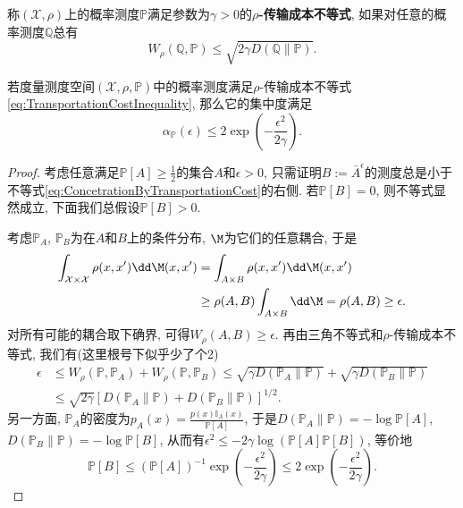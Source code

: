  称$(\mathcal{X}, \rho)$上的概率测度$\mathbb{P}$满足参数为$\gamma > 0$的\textbf{$\rho$-传输成本不等式}, 如果对任意的概率测度$\mathbb{Q}$总有
 \begin{equation}\label{eq:TransportationCostInequality}
 	W_{\rho} (\mathbb{Q}, \mathbb{P}) \leq \sqrt{2 \gamma D(\mathbb{Q} \| \mathbb{P})}.
 \end{equation}

\begin{theorem}
	若度量测度空间$(\mathcal{X}, \rho, \mathbb{P})$中的概率测度满足$\rho$-传输成本不等式\eqref{eq:TransportationCostInequality}, 那么它的集中度满足
	\begin{equation}\label{eq:ConcetrationByTransportationCost}
		\alpha_{\mathbb{P}}(\epsilon) \leq 2 \exp \left(- \frac{\epsilon^2}{2 \gamma} \right).
	\end{equation}
\end{theorem}
\begin{proof}
	考虑任意满足$\mathbb{P}[A] \geq \frac12$的集合$A$和$\epsilon > 0$, 只需证明$B := \bar A^{\epsilon}$的测度总是小于不等式\eqref{eq:ConcetrationByTransportationCost}的右侧. 
	若$\mathbb{P}[B] = 0$, 则不等式显然成立, 下面我们总假设$\mathbb{P}[B] > 0$. 
	
	考虑$\mathbb{P}_A$, $\mathbb{P}_B$为在$A$和$B$上的条件分布, $\M$为它们的任意耦合, 于是
	\begin{align*}
		\int_{\mathcal{X} \times \mathcal{X}} \rho(x, x') \dd \M(x, x')
		&= \int_{A \times B} \rho(x, x') \dd \M(x, x') \\
		&\geq \rho(A, B) \int_{A \times B} \dd \M 
		= \rho(A, B) 
		\geq \epsilon. 
	\end{align*}
	对所有可能的耦合取下确界, 可得$W_{\rho}(A, B) \geq \epsilon$. 
	再由三角不等式和$\rho$-传输成本不等式, 我们有(这里根号下似乎少了个2)
	\begin{align*}
		\epsilon 
		&\leq W_{\rho}(\mathbb{P}, \mathbb{P}_A) + W_{\rho}(\mathbb{P}, \mathbb{P}_B) 
		\leq \sqrt{\gamma D(\mathbb{P}_A \| \mathbb{P})} + \sqrt{\gamma D(\mathbb{P}_B \| \mathbb{P})} \\
		&\leq \sqrt{2 \gamma} \left[ D(\mathbb{P}_A \| \mathbb{P}) + D(\mathbb{P}_B \| \mathbb{P}) \right]^{1/2}.
	\end{align*}
	另一方面, $\mathbb{P}_A$的密度为$p_A(x) = \frac{p(x) \mathbb I_A(x)}{\mathbb{P}[A]}$, 于是$D(\mathbb{P}_A \| \mathbb{P}) = - \log \mathbb{P}[A]$, $D(\mathbb{P}_B \| \mathbb{P}) = -\log \mathbb{P}[B]$, 从而有$\epsilon^2 \leq -  2 \gamma \log (\mathbb{P}[A] \mathbb{P}[B])$, 等价地
	\begin{equation*}
		 \mathbb{P}[B] 
		 \leq (\mathbb{P}[A])^{-1} \exp\left(- \frac{\epsilon^2}{2 \gamma} \right) 
		 \leq 2 \exp\left(- \frac{\epsilon^2}{2 \gamma} \right). 
	\end{equation*}
\end{proof}



